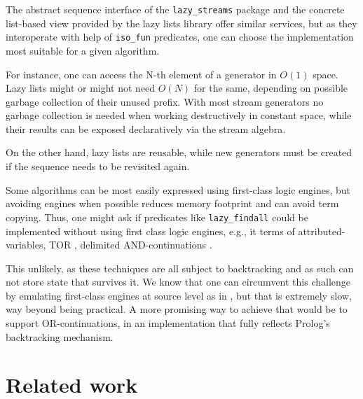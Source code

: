 \documentclass{new_tlp}
\begin{document}
The abstract sequence interface of the {\tt lazy\_streams} package and
the concrete list-based view provided by the lazy lists library offer
similar services, but as they interoperate with help of {\tt iso\_fun} predicates,
one can choose the  implementation most suitable for a given algorithm.

For instance, one  can access the N-th element of a  generator in $O(1)$ space.
Lazy lists might or might not need $O(N)$ for the same, depending on possible garbage collection of their unused prefix.
With most stream generators no garbage collection is needed when working destructively in constant space, while their results can be exposed declaratively via the stream algebra.

On the other hand, lazy lists are reusable, while new generators 
must be created if the sequence needs to be revisited again.

Some algorithms can be most easily expressed using first-class logic engines, but
avoiding engines when possible reduces memory footprint and can avoid term copying.
Thus, one might ask if predicates like {\tt lazy\_findall} could be implemented
without using first class logic engines, e.g., it terms of  
attributed-variables, 
TOR \cite{tor}, delimited AND-continuations \cite{delim}.

This unlikely, as  these techniques are all subject to backtracking and as such can not
store state that survives it. We know that one can circumvent this challenge
by emulating first-class engines at source level as in \cite{padl09inter}, but that is 
extremely slow, way beyond being practical. A more promising
way to achieve  that would be to support
OR-continuations, in an implementation that fully reflects Prolog's backtracking
mechanism.

\section{Related work}\label{rel}

\begin{comment}
Maybe?
\BI 
\I some history - see
\cite{tarau:parimp99,tarau:cl2000,iclp08:inter,ciclops08:pINTER}
\cite{coord11tarau}
\cite{bp2011}
\I work on delimited continuations \cite{delim}, hookable disjunction \cite{tor}
\I work on pipelines \cite{pipelines}
\EI
\end{comment}
\end{document}
